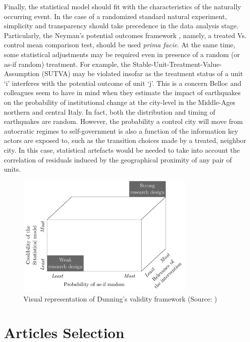 \documentclass[nobib]{tufte-handout}
\begin{document}
\begin{refsection}
Finally, the statistical model should fit with the characteristics of the
naturally occurring event. In the case of a randomized standard natural
experiment, simplicity and transparency should take precedence in the data
analysis stage. Particularly, the Neyman's potential outcomes framework
\parencite[][]{Splawa1990}, namely, a treated Vs. control mean comparison test,
should be used \emph{prima facie}. At the same time, some statistical
adjustments may be required even in presence of a random (or as-if random)
treatment. For example, the Stable-Unit-Treatment-Value-Assumption (SUTVA) may
be violated insofar as the treatment status of a unit `i' interferes with the
potential outcome of unit `j'. This is a concern Belloc and colleagues
\parencite*[][]{Belloc2016} seem to have in mind when they estimate the impact
of earthquakes on the probability of institutional change at the city-level in
the Middle-Ages northern and central Italy. In fact, both the distribution and
timing of earthquakes are random. However, the probability a control city will
move from autocratic regimes to self-government is also a function of the
information key actors are exposed to, such as the transition choices made by a
treated, neighbor city. In this case, statistical artefacts would be needed to
take into account the correlation of residuals induced by the geographical
proximity of any pair of units.

\begin{figure}[]
    \centering
    \includegraphics[width=0.78\textwidth]{images/validity_framework.pdf}
    \caption{Visual representation of Dunning's validity framework (Source:
    \cite[][page 31]{Dunning2012})}
    \label{fig:validity_framework}
\end{figure}


\section{Articles Selection}
\label{sec:article_selection}


\end{refsection}
\end{document}
